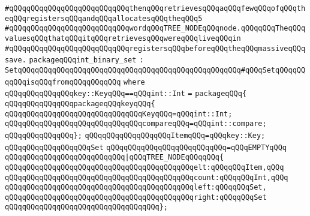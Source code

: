 \verb|#qQQqqQQqqQQqqQQqqQQqqQQqqQQqthenqQQqretrievesqQQqaqQQqfewqQQqofqQQqtheqQQqregistersqQQqandqQQqallocatesqQQqtheqQQq5|\newline
\verb|#qQQqqQQqqQQqqQQqqQQqqQQqqQQqwordqQQqTREE_NODEqQQqnode.qQQqqQQqTheqQQqvaluesqQQqthatqQQqitqQQqretrievesqQQqwereqQQqliveqQQqin|\newline
\verb|#qQQqqQQqqQQqqQQqqQQqqQQqqQQqregistersqQQqbeforeqQQqtheqQQqmassiveqQQqsave.|\newline
\newline
\newline
\verb|packageqQQqint_binary_set|\newline
\verb|:|\newline
\verb|SetqQQqqQQqqQQqqQQqqQQqqQQqqQQqqQQqqQQqqQQqqQQqqQQqqQQq#qQQqSetqQQqqQQqqQQqisqQQqfromqQQqqQQqqQQq|\newline
\verb|where|\newline
\verb|qQQqqQQqqQQqqQQqkey::KeyqQQq==qQQqint::Int|\newline
\verb|=|\newline
\verb|packageqQQq{|\newline
\verb|qQQqqQQqqQQqqQQqpackageqQQqkeyqQQq{|\newline
\verb|qQQqqQQqqQQqqQQqqQQqqQQqqQQqqQQqKeyqQQq=qQQqint::Int;|\newline
\verb|qQQqqQQqqQQqqQQqqQQqqQQqqQQqqQQqcompareqQQq=qQQqint::compare;|\newline
\verb|qQQqqQQqqQQqqQQq};|\newline
\newline
\verb|qQQqqQQqqQQqqQQqqQQqItemqQQq=qQQqkey::Key;|\newline
\newline
\verb|qQQqqQQqqQQqqQQqqQQqSet|\newline
\verb|qQQqqQQqqQQqqQQqqQQqqQQqqQQq=qQQqEMPTYqQQq|\newline
\verb|qQQqqQQqqQQqqQQqqQQqqQQqqQQq|\verb#|qQQqTREE_NODEqQQqqQQq{#\newline
\verb|qQQqqQQqqQQqqQQqqQQqqQQqqQQqqQQqqQQqqQQqqQQqelt:qQQqqQQqItem,qQQq|\newline
\verb|qQQqqQQqqQQqqQQqqQQqqQQqqQQqqQQqqQQqqQQqqQQqcount:qQQqqQQqInt,qQQq|\newline
\verb|qQQqqQQqqQQqqQQqqQQqqQQqqQQqqQQqqQQqqQQqqQQqleft:qQQqqQQqSet,|\newline
\verb|qQQqqQQqqQQqqQQqqQQqqQQqqQQqqQQqqQQqqQQqqQQqright:qQQqqQQqSet|\newline
\verb|qQQqqQQqqQQqqQQqqQQqqQQqqQQqqQQqqQQq};|\newline
